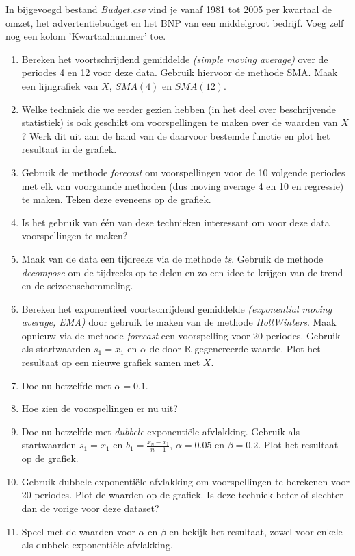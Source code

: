 \begin{exercise}
In bijgevoegd bestand \emph{Budget.csv} vind je vanaf 1981 tot 2005 per kwartaal de omzet, het advertentiebudget en het BNP van een middelgroot bedrijf. Voeg zelf nog een kolom 'Kwartaalnummer' toe.
\begin{enumerate}
	\item Bereken het voortschrijdend gemiddelde \emph{(simple moving average)} over de periodes 4 en 12 voor deze data. Gebruik hiervoor de methode SMA. Maak een lijngrafiek van $X$, $SMA(4)$ en $SMA(12)$.
	\item Welke techniek die we eerder gezien hebben (in het deel over beschrijvende statistiek) is ook geschikt om voorspellingen te maken over de waarden van $X$? Werk dit uit aan de hand van de daarvoor bestemde functie en plot het resultaat in de grafiek.
	\item Gebruik de methode \emph{forecast} om voorspellingen voor de 10 volgende periodes met elk van voorgaande methoden (dus moving average 4 en 10 en regressie) te maken. Teken deze eveneens op de grafiek.
\item Is het gebruik van één van deze technieken interessant om voor deze data voorspellingen te maken? 
\item Maak van de data een tijdreeks via de methode \emph{ts}. Gebruik de methode \emph{decompose} om de tijdreeks op te delen en zo een idee te krijgen van de trend en de seizoenschommeling.
 \item Bereken het exponentieel voortschrijdend gemiddelde \emph{(exponential moving average, EMA)} door gebruik te maken van de methode \emph{HoltWinters}. Maak opnieuw via de methode \emph{forecast} een voorspelling voor 20 periodes. Gebruik als startwaarden $s_1 = x_1$ en $\alpha $ de door R gegenereerde waarde. Plot het resultaat op een nieuwe grafiek samen met $X$.
\item Doe nu hetzelfde met $\alpha=0.1$. 
\item Hoe zien de voorspellingen er nu uit?
\item Doe nu hetzelfde met \emph{dubbele} exponentiële afvlakking. Gebruik als startwaarden $s_1 = x_1$ en $b_1 = \frac{x_n - x_1}{n - 1}$, $\alpha =  0.05$ en $\beta = 0.2$. Plot het resultaat op de grafiek.
\item Gebruik dubbele exponentiële afvlakking om voorspellingen te berekenen voor 20 periodes. Plot de waarden op de grafiek. Is deze techniek beter of slechter dan de vorige voor deze dataset?
\item Speel met de waarden voor $\alpha$ en $\beta$ en bekijk het resultaat, zowel voor enkele als dubbele exponentiële afvlakking.

\end{enumerate}
\end{exercise}
